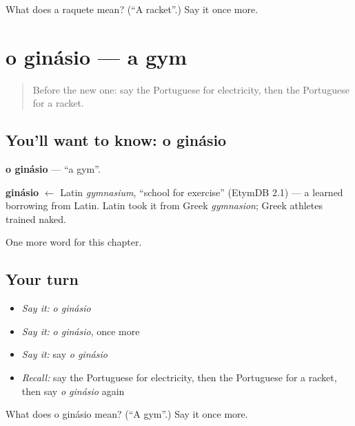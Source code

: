 \begin{tcolorbox}[breakable,colback=teal!4,colframe=teal!35!black,title={Before you move on}]
What does a raquete mean? (\textquotedblleft{}A racket\textquotedblright{}.) Say it once more.
\end{tcolorbox}
\section[o ginásio]{o ginásio — a gym}

\label{lesson:PT-C226-ginasio}



\begin{quote}
Before the new one: say the Portuguese for electricity, then the Portuguese for a racket.
\end{quote}

\subsection*{You'll want to know: o ginásio}
\textbf{o ginásio} — \textquotedblleft{}a gym\textquotedblright{}.

\begin{cousinweb}
\textbf{ginásio} $\leftarrow$ Latin \emph{gymnasium}, \textquotedblleft{}school for exercise\textquotedblright{} (EtymDB 2.1) — a learned borrowing from Latin. Latin took it from Greek \emph{gymnasion}; Greek athletes trained naked.
\end{cousinweb}

\begin{grammarlens}[title={What you've built}]
One more word for this chapter.
\end{grammarlens}

\subsection*{Your turn}
\begin{itemize}
\raggedright
  \item \emph{Say it:} \emph{o ginásio}
  \item \emph{Say it:} \emph{o ginásio}, once more
  \item \emph{Say it:} say \emph{o ginásio}
  \item \emph{Recall:} say the Portuguese for electricity, then the Portuguese for a racket, then say \emph{o ginásio} again
\end{itemize}

\begin{tcolorbox}[breakable,colback=teal!4,colframe=teal!35!black,title={Before you move on}]
What does o ginásio mean? (\textquotedblleft{}A gym\textquotedblright{}.) Say it once more.
\end{tcolorbox}
